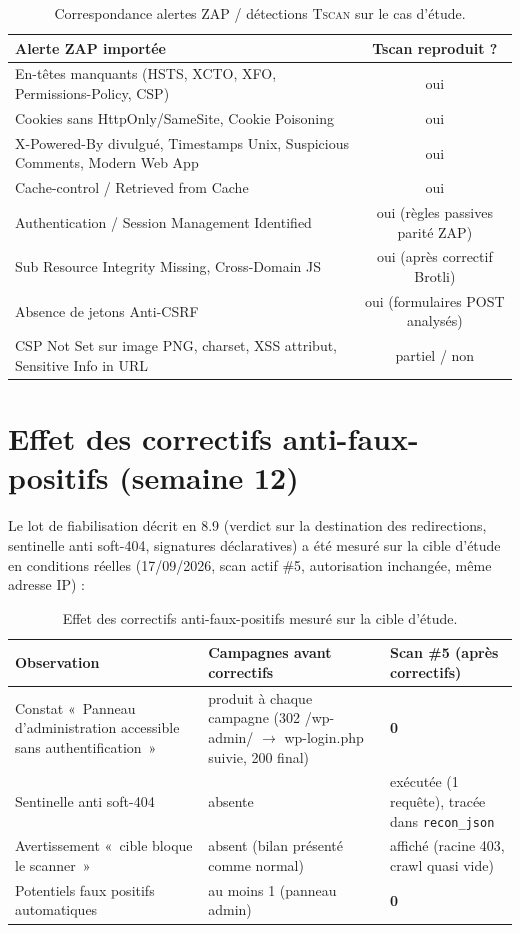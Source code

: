 \documentclass[11pt,a4paper]{report}
\newcommand{\tscan}{\textsc{Tscan}}
\newcommand{\code}[1]{\texttt{#1}}
\begin{document}
\begin{table}[h!]
\centering
\small
\begin{tabular}{@{}p{10.5cm}c@{}}
\toprule
\textbf{Alerte ZAP importée} & \textbf{Tscan reproduit ?} \\
\midrule
En-têtes manquants (HSTS, XCTO, XFO, Permissions-Policy, CSP) & oui \\
Cookies sans HttpOnly/SameSite, Cookie Poisoning & oui \\
X-Powered-By divulgué, Timestamps Unix, Suspicious Comments, Modern Web App & oui \\
Cache-control / Retrieved from Cache & oui \\
Authentication / Session Management Identified & oui (règles passives parité ZAP) \\
Sub Resource Integrity Missing, Cross-Domain JS & oui (après correctif Brotli) \\
Absence de jetons Anti-CSRF & oui (formulaires POST analysés) \\
CSP Not Set sur image PNG, charset, XSS attribut, Sensitive Info in URL & partiel / non \\
\bottomrule
\end{tabular}
\caption{Correspondance alertes ZAP / détections \tscan{} sur le cas d'étude.}
\end{table}

\section{Effet des correctifs anti-faux-positifs (semaine 12)}

Le lot de fiabilisation décrit en 8.9 (verdict sur la destination des redirections,
sentinelle anti soft-404, signatures déclaratives) a été mesuré sur la cible d'étude en
conditions réelles (17/09/2026, scan actif \#5, autorisation inchangée, même adresse IP) :

\begin{table}[h!]
\centering
\small
\begin{tabular}{@{}p{5.6cm}p{4.6cm}p{4.6cm}@{}}
\toprule
\textbf{Observation} & \textbf{Campagnes avant correctifs} & \textbf{Scan \#5 (après correctifs)} \\
\midrule
Constat «~Panneau d'administration accessible sans authentification~» &
produit à chaque campagne (302 /wp-admin/ $\rightarrow$ wp-login.php suivie, 200 final) &
\textbf{0} \\
Sentinelle anti soft-404 & absente & exécutée (1 requête), tracée dans \code{recon\_json} \\
Avertissement «~cible bloque le scanner~» & absent (bilan présenté comme normal) &
affiché (racine 403, crawl quasi vide) \\
Potentiels faux positifs automatiques & au moins 1 (panneau admin) & \textbf{0} \\
\bottomrule
\end{tabular}
\caption{Effet des correctifs anti-faux-positifs mesuré sur la cible d'étude.}
\end{table}
\end{document}
